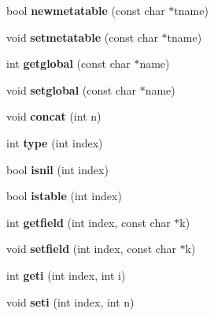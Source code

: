 \begin{DoxyCompactItemize}
bool {\bfseries newmetatable} (const char $\ast$tname)
\item 
\mbox{\label{classlua_1_1State_a96eb75943261fa23bb86feb21c3f60cd}} 
void {\bfseries setmetatable} (const char $\ast$tname)
\item 
\mbox{\label{classlua_1_1State_ac47548f3396d21cd777b2dec0bdae0e4}} 
int {\bfseries getglobal} (const char $\ast$name)
\item 
\mbox{\label{classlua_1_1State_ad110f235dd19f4c2409de5cfd62222fd}} 
void {\bfseries setglobal} (const char $\ast$name)
\item 
\mbox{\label{classlua_1_1State_a39eb52fe6b301ab7169149da013075ff}} 
void {\bfseries concat} (int n)
\item 
\mbox{\label{classlua_1_1State_aacdae6b5e24a87acd23e702b775fb99e}} 
int {\bfseries type} (int index)
\item 
\mbox{\label{classlua_1_1State_ae36960f81c8554bd8580de79c16c31bb}} 
bool {\bfseries isnil} (int index)
\item 
\mbox{\label{classlua_1_1State_ae2329d1e53b711f68b13d7a2b57a5b56}} 
bool {\bfseries istable} (int index)
\item 
\mbox{\label{classlua_1_1State_a2c126bb2c15a3fd9aa39ba7de5a76fb8}} 
int {\bfseries getfield} (int index, const char $\ast$k)
\item 
\mbox{\label{classlua_1_1State_aae6dd036cbc7bf1d490ad2179300ca12}} 
void {\bfseries setfield} (int index, const char $\ast$k)
\item 
\mbox{\label{classlua_1_1State_aff18ee323aa5cf8851f1e06dcd1bb2fc}} 
int {\bfseries geti} (int index, int i)
\item 
\mbox{\label{classlua_1_1State_aba751b4585be9011f2a6a4019009a742}} 
void {\bfseries seti} (int index, int n)
\item 
\mbox{\label{classlua_1_1State_a8faf61c805c97bdf947882ad76f613e9}} 

\end{DoxyCompactItemize}
